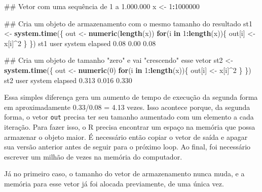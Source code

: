 \documentclass[10pt,a4paper]{book}
\newenvironment{Shaded}{\begin{snugshade}}{\end{snugshade}}
\newcommand{\KeywordTok}[1]{\textcolor[rgb]{0.13,0.29,0.53}{\textbf{#1}}}
\newcommand{\DecValTok}[1]{\textcolor[rgb]{0.00,0.00,0.81}{#1}}
\newcommand{\FloatTok}[1]{\textcolor[rgb]{0.00,0.00,0.81}{#1}}
\newcommand{\StringTok}[1]{\textcolor[rgb]{0.31,0.60,0.02}{#1}}
\newcommand{\ControlFlowTok}[1]{\textcolor[rgb]{0.13,0.29,0.53}{\textbf{#1}}}
\newcommand{\OperatorTok}[1]{\textcolor[rgb]{0.81,0.36,0.00}{\textbf{#1}}}
\newcommand{\NormalTok}[1]{#1}
\begin{document}
\begin{Shaded}
\begin{Highlighting}[]
\NormalTok{## Vetor com uma sequência de 1 a 1.000.000}
\NormalTok{x <-}\StringTok{ }\DecValTok{1}\OperatorTok{:}\DecValTok{1000000}

\NormalTok{## Cria um objeto de armazenamento com o mesmo tamanho do resultado}
\NormalTok{st1 <-}\StringTok{ }\KeywordTok{system.time}\NormalTok{(\{}
\NormalTok{    out <-}\StringTok{ }\KeywordTok{numeric}\NormalTok{(}\KeywordTok{length}\NormalTok{(x))}
    \ControlFlowTok{for}\NormalTok{(i }\ControlFlowTok{in} \DecValTok{1}\OperatorTok{:}\KeywordTok{length}\NormalTok{(x))\{}
\NormalTok{        out[i] <-}\StringTok{ }\NormalTok{x[i]}\OperatorTok{^}\DecValTok{2}
\NormalTok{    \}}
\NormalTok{\})}
\NormalTok{st1}
\NormalTok{   user  system elapsed }
   \FloatTok{0.08}    \FloatTok{0.00}    \FloatTok{0.08} 

\NormalTok{## Cria um objeto de tamanho "zero" e vai "crescendo" esse vetor}
\NormalTok{st2 <-}\StringTok{ }\KeywordTok{system.time}\NormalTok{(\{}
\NormalTok{    out <-}\StringTok{ }\KeywordTok{numeric}\NormalTok{(}\DecValTok{0}\NormalTok{)}
    \ControlFlowTok{for}\NormalTok{(i }\ControlFlowTok{in} \DecValTok{1}\OperatorTok{:}\KeywordTok{length}\NormalTok{(x))\{}
\NormalTok{        out[i] <-}\StringTok{ }\NormalTok{x[i]}\OperatorTok{^}\DecValTok{2}
\NormalTok{    \}}
\NormalTok{\})}
\NormalTok{st2}
\NormalTok{   user  system elapsed }
  \FloatTok{0.313}   \FloatTok{0.016}   \FloatTok{0.330} 
\end{Highlighting}
\end{Shaded}

Essa simples diferença gera um aumento de tempo de execução da segunda
forma em aproximadamente 0.33/0.08 = 4.13 vezes. Isso acontece porque,
da segunda forma, o vetor \texttt{out} precisa ter seu tamanho aumentado
com um elemento a cada iteração. Para fazer isso, o R precisa encontrar
um espaço na memória que possa armazenar o objeto maior. É necessário
então copiar o vetor de saída e apagar sua versão anterior antes de
seguir para o próximo loop. Ao final, foi necessário escrever um milhão
de vezes na memória do computador.

Já no primeiro caso, o tamanho do vetor de armazenamento nunca muda, e a
memória para esse vetor já foi alocada previamente, de uma única vez.
\end{document}
